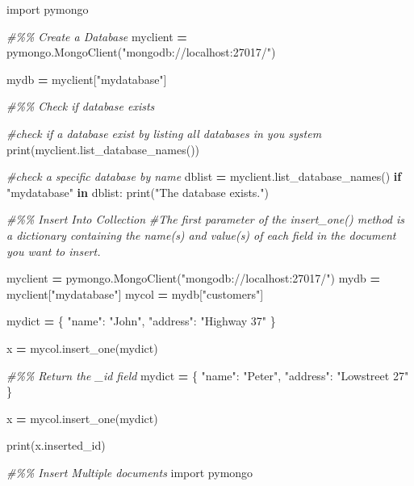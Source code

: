\documentclass[
]{book}
\newenvironment{Shaded}{\begin{snugshade}}{\end{snugshade}}
\newcommand{\BuiltInTok}[1]{#1}
\newcommand{\CommentTok}[1]{\textcolor[rgb]{0.56,0.35,0.01}{\textit{#1}}}
\newcommand{\ControlFlowTok}[1]{\textcolor[rgb]{0.13,0.29,0.53}{\textbf{#1}}}
\newcommand{\ImportTok}[1]{#1}
\newcommand{\KeywordTok}[1]{\textcolor[rgb]{0.13,0.29,0.53}{\textbf{#1}}}
\newcommand{\NormalTok}[1]{#1}
\newcommand{\OperatorTok}[1]{\textcolor[rgb]{0.81,0.36,0.00}{\textbf{#1}}}
\newcommand{\StringTok}[1]{\textcolor[rgb]{0.31,0.60,0.02}{#1}}
\begin{document}
\begin{Shaded}
\begin{Highlighting}[]
\ImportTok{import}\NormalTok{ pymongo}

\CommentTok{\#\%\% Create a Database}
\NormalTok{myclient }\OperatorTok{=}\NormalTok{ pymongo.MongoClient(}\StringTok{"mongodb://localhost:27017/"}\NormalTok{)}

\NormalTok{mydb }\OperatorTok{=}\NormalTok{ myclient[}\StringTok{"mydatabase"}\NormalTok{]}

\CommentTok{\#\%\% Check if database exists}

\CommentTok{\#check if a database exist by listing all databases in you system}
\BuiltInTok{print}\NormalTok{(myclient.list\_database\_names())}

\CommentTok{\#check a specific database by name}
\NormalTok{dblist }\OperatorTok{=}\NormalTok{ myclient.list\_database\_names()}
\ControlFlowTok{if} \StringTok{"mydatabase"} \KeywordTok{in}\NormalTok{ dblist:}
  \BuiltInTok{print}\NormalTok{(}\StringTok{"The database exists."}\NormalTok{)}

\CommentTok{\#\%\% Insert Into Collection}
\CommentTok{\#The first parameter of the insert\_one() method is a dictionary containing the name(s) and value(s) of each field in the document you want to insert.}


\NormalTok{myclient }\OperatorTok{=}\NormalTok{ pymongo.MongoClient(}\StringTok{"mongodb://localhost:27017/"}\NormalTok{)}
\NormalTok{mydb }\OperatorTok{=}\NormalTok{ myclient[}\StringTok{"mydatabase"}\NormalTok{]}
\NormalTok{mycol }\OperatorTok{=}\NormalTok{ mydb[}\StringTok{"customers"}\NormalTok{]}

\NormalTok{mydict }\OperatorTok{=}\NormalTok{ \{ }\StringTok{"name"}\NormalTok{: }\StringTok{"John"}\NormalTok{, }\StringTok{"address"}\NormalTok{: }\StringTok{"Highway 37"}\NormalTok{ \}}

\NormalTok{x }\OperatorTok{=}\NormalTok{ mycol.insert\_one(mydict)}

\CommentTok{\#\%\% Return the \_id field}
\NormalTok{mydict }\OperatorTok{=}\NormalTok{ \{ }\StringTok{"name"}\NormalTok{: }\StringTok{"Peter"}\NormalTok{, }\StringTok{"address"}\NormalTok{: }\StringTok{"Lowstreet 27"}\NormalTok{ \}}

\NormalTok{x }\OperatorTok{=}\NormalTok{ mycol.insert\_one(mydict)}

\BuiltInTok{print}\NormalTok{(x.inserted\_id)}

\CommentTok{\#\%\% Insert Multiple documents}
\ImportTok{import}\NormalTok{ pymongo}


\end{Highlighting}
\end{Shaded}
\end{document}
